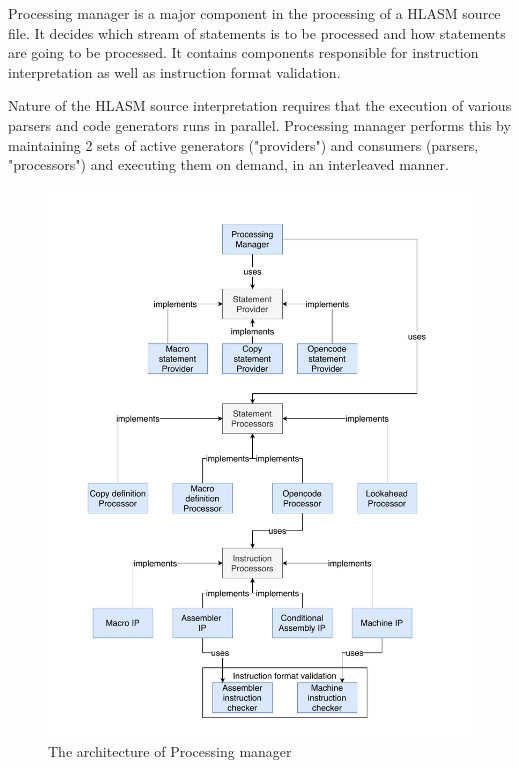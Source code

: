 \label{chap:process}
Processing manager is a major component in the processing of a HLASM source file. It decides which stream of statements is to be processed and how statements are going to be processed. It contains components responsible for instruction interpretation as well as instruction format validation. 

Nature of the HLASM source interpretation requires that the execution of various parsers and code generators runs in parallel. Processing manager performs this by maintaining 2 sets of active generators ("providers") and consumers (parsers, "processors") and executing them on demand, in an interleaved manner.

\begin{figure}
	\centering
	\includegraphics[width=\textwidth]{img/processing_manager_arch}
	\caption{The architecture of Processing manager}
	\label{fig06:proc_mngr}
\end{figure}

